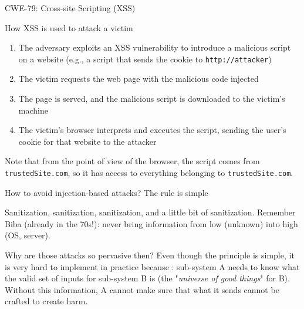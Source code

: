 \begin{parag}{CWE-79: Cross-site Scripting (XSS)}
\begin{subparag}{How XSS is used to attack a victim}
        \begin{enumerate}
            \item The adversary exploits an XSS vulnerability to introduce a malicious script on a website (e.g., a script that sends the cookie to \texttt{http://attacker})
            \item The victim requests the web page with the malicious code injected
            \item The page is served, and the malicious script is downloaded to the victim's machine
            \item The victim's browser interprets and executes the script, sending the user's cookie for that website to the attacker
        \end{enumerate}
        Note that from the point of view of the browser, the script comes from \texttt{trustedSite.com}, so it has access to everything belonging to \texttt{trustedSite.com}.
    \end{subparag}
\end{parag}

\begin{parag}{How to avoid injection-based attacks?}
    The rule is simple
    \begin{center}
    \end{center}
    Sanitization, sanitization, sanitization, and a little bit of sanitization. Remember Biba (already in the 70s!): never bring information from low (unknown) into high (OS, server).
    \begin{subparag}{Why are those attacks so pervasive then?}
        Even though the principle is simple, it is very hard to implement in practice because : sub-system A needs to know what the valid set of inputs for sub-system B is (the "\textit{universe of good things}" for B). Without this information, A cannot make sure that what it sends cannot be crafted to create harm.
    \end{subparag}
\end{parag}

